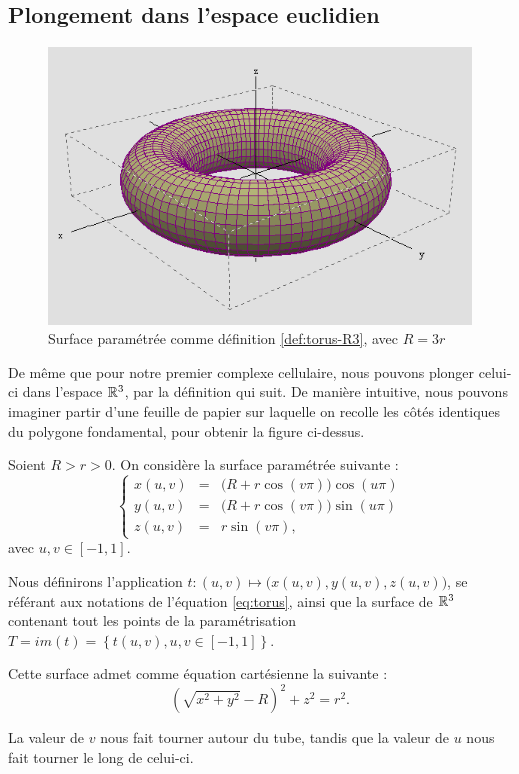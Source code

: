\documentclass[hidelinks, 10pt]{article}
\begin{document}
\subsection{Plongement dans l'espace euclidien}


\begin{figure}[H]
    \centering
    \includegraphics[width=0.5\linewidth]{pictures/Tore.png}
    \caption{Surface paramétrée comme définition \ref{def:torus-R3}, avec $R=3r$}
    \label{fig:torus}
\end{figure}

De même que pour notre premier complexe cellulaire, nous pouvons plonger celui-ci dans l'espace $\mathbb{R}^3$, par la définition qui suit. De manière intuitive, nous pouvons imaginer partir d'une feuille de papier sur laquelle on recolle les côtés identiques du polygone fondamental, pour obtenir la figure ci-dessus.

\begin{definition}\label{def:torus-R3}
Soient $R>r>0$. On considère la surface paramétrée suivante : \begin{equation}\label{eq:torus}
\left\{\begin{matrix}
x(u,v)&=&\big(R+r\cos (v\pi)\big)\cos (u\pi)\\ 
y(u,v)&=&\big(R+r\cos (v\pi)\big)\sin (u\pi)\\ 
z(u,v)&=&r\sin (v\pi),
\end{matrix}\right.
\end{equation}avec $u,v\in[-1,1]$.

Nous définirons l'application $t:(u,v)\mapsto\big(x(u,v),y(u,v),z(u,v)\big)$, se référant aux notations de l'équation \eqref{eq:torus}, ainsi que la surface de $\mathbb{R}^3$ contenant tout les points de la paramétrisation $T=im(t)=\left\{t(u,v),u,v\in[-1,1]\right\}$.

Cette surface admet comme équation cartésienne la suivante :\[(\sqrt{x^2+y^2}-R)^2+z^2=r^2.\]
\end{definition}

\begin{remark}
La valeur de $v$ nous fait tourner autour du tube, tandis que la valeur de $u$ nous fait tourner le long de celui-ci.
\end{remark}
\end{document}
